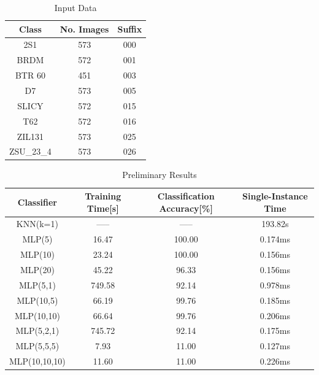 \begin{table}
	\centering
	\begin{tabular}{|c|c|c|}
		\hline
		\textbf{Class} & \textbf{No. Images} & \textbf{Suffix} \\
		\hline
		2S1        & 573 & 000 \\ \hline
		BRDM       & 572 & 001 \\ \hline
		BTR 60     & 451 & 003 \\ \hline
		D7         & 573 & 005 \\ \hline
		SLICY      & 572 & 015 \\ \hline
		T62        & 572 & 016 \\ \hline
		ZIL131     & 573 & 025 \\ \hline
		ZSU\_23\_4 & 573 & 026 \\ \hline	
	\end{tabular}
	\caption{Input Data}
	\label{tab:input_data}
	\centering
\end{table}

\begin{table}
	\centering
	\begin{tabular}{|c|c|c|c|}
		
		\hline
		\textbf{Classifier} & \textbf{Training Time[s]} & \textbf{Classification Accuracy[\%]} & \textbf{Single-Instance Time} \\
		\hline
		KNN(k=1)		 & -----	   & -----  & 193.82s \\ \hline
		MLP(5) 	     	 & 16.47   & 100.00 & 0.174ms   \\ \hline
		MLP(10) 	     & 23.24   & 100.00 & 0.156ms   \\ \hline
		MLP(20) 	     & 45.22   & 96.33  & 0.156ms \\ \hline
		MLP(5,1)	     & 749.58  & 92.14  & 0.978ms \\ \hline
		MLP(10,5)	     & 66.19   & 99.76  & 0.185ms \\ \hline
		MLP(10,10)       & 66.64   & 99.76  & 0.206ms \\ \hline
		MLP(5,2,1) 	     & 745.72  & 92.14  & 0.175ms \\ \hline
		MLP(5,5,5) 	     & 7.93    & 11.00  & 0.127ms \\ \hline
		MLP(10,10,10)    & 11.60   & 11.00  & 0.226ms \\ \hline
		
	\end{tabular}
	\caption{Preliminary Results}
	\label{tab:final_results}
	\centering
\end{table}


